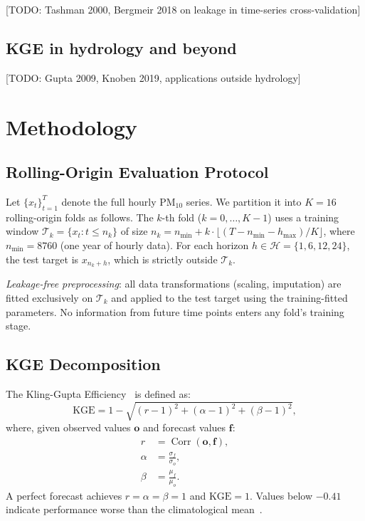 \documentclass[11pt,a4paper]{article}
\begin{document}
[TODO: Tashman 2000, Bergmeir 2018 on leakage in time-series cross-validation]

\subsection{KGE in hydrology and beyond}

[TODO: Gupta 2009, Knoben 2019, applications outside hydrology]

\section{Methodology}\label{sec:method}

\subsection{Rolling-Origin Evaluation Protocol}\label{sec:protocol}

Let $\{x_t\}_{t=1}^{T}$ denote the full hourly PM$_{10}$ series.
We partition it into $K=16$ rolling-origin folds as follows.
The $k$-th fold ($k=0,\ldots,K-1$) uses a training window
$\mathcal{T}_k = \{x_t : t \le n_k\}$ of size
$n_k = n_{\min} + k \cdot \lfloor(T - n_{\min} - h_{\max})/K\rfloor$,
where $n_{\min} = 8760$ (one year of hourly data).
For each horizon $h \in \mathcal{H} = \{1, 6, 12, 24\}$, the test target is
$x_{n_k + h}$, which is strictly outside $\mathcal{T}_k$.

\emph{Leakage-free preprocessing}: all data transformations (scaling,
imputation) are fitted exclusively on $\mathcal{T}_k$ and applied to the
test target using the training-fitted parameters.
No information from future time points enters any fold's training stage.

\subsection{KGE Decomposition}\label{sec:kge}

The Kling-Gupta Efficiency~\citep{gupta2009} is defined as:
\begin{equation}
  \mathrm{KGE} = 1 - \sqrt{(r-1)^2 + (\alpha-1)^2 + (\beta-1)^2},
  \label{eq:kge}
\end{equation}
where, given observed values $\mathbf{o}$ and forecast values $\mathbf{f}$:
\begin{align}
  r      &= \operatorname{Corr}(\mathbf{o},\mathbf{f}), \label{eq:r}\\
  \alpha &= \frac{\sigma_f}{\sigma_o}, \label{eq:alpha}\\
  \beta  &= \frac{\mu_f}{\mu_o}. \label{eq:beta}
\end{align}
A perfect forecast achieves $r = \alpha = \beta = 1$ and
$\mathrm{KGE} = 1$.
Values below $-0.41$ indicate performance worse than the climatological
mean~\citep{Knoben2019}.
\end{document}
